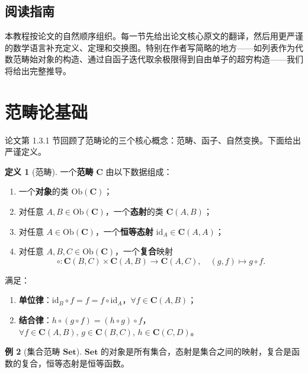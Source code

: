 \documentclass[12pt,a4paper]{ctexart}
\theoremstyle{definition}
\newtheorem{definition}{定义}[section]
\newtheorem{example}[definition]{例}
\newcommand{\cat}[1]{\mathbf{#1}}
\newcommand{\Set}{\cat{Set}}
\newcommand{\id}{\mathrm{id}}
\newcommand{\ob}[1]{\mathrm{Ob}(#1)}
\begin{document}
\subsection{阅读指南}

本教程按论文的自然顺序组织。每一节先给出论文核心原文的翻译，然后用更严谨的数学语言补充定义、定理和交换图。特别在作者写简略的地方——如列表作为代数范畴始对象的构造、通过自函子迭代取余极限得到自由单子的超穷构造——我们将给出完整推导。

\newpage

\section{范畴论基础}

论文第 1.3.1 节回顾了范畴论的三个核心概念：范畴、函子、自然变换。下面给出严谨定义。

\begin{definition}[范畴]\label{def:category}
一个\textbf{范畴} $\cat C$ 由以下数据组成：
\begin{enumerate}[label=(\arabic*),nosep]
    \item 一个\textbf{对象}的类 $\ob{\cat C}$；
    \item 对任意 $A,B\in\ob{\cat C}$，一个\textbf{态射}的类 $\cat C(A,B)$；
    \item 对任意 $A\in\ob{\cat C}$，一个\textbf{恒等态射} $\id_A\in\cat C(A,A)$；
    \item 对任意 $A,B,C\in\ob{\cat C}$，一个\textbf{复合}映射
    \[\circ:\cat C(B,C)\times\cat C(A,B)\longrightarrow\cat C(A,C),\quad (g,f)\mapsto g\circ f.\]
\end{enumerate}
满足：
\begin{enumerate}[label=(\roman*),nosep]
    \item \textbf{单位律}：$\id_B\circ f=f=f\circ\id_A$，$\forall f\in\cat C(A,B)$；
    \item \textbf{结合律}：$h\circ(g\circ f)=(h\circ g)\circ f$，$\forall f\in\cat C(A,B),\,g\in\cat C(B,C),\,h\in\cat C(C,D)$。
\end{enumerate}
\end{definition}

\begin{example}[集合范畴 $\Set$]\label{ex:set}
$\Set$ 的对象是所有集合，态射是集合之间的映射，复合是函数的复合，恒等态射是恒等函数。
\end{example}
\end{document}
